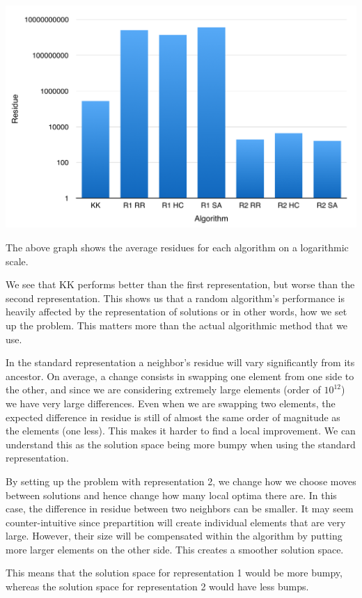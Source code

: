 \documentclass[11pt]{article}
\begin{document}
\begin{center}
\includegraphics[scale=0.5]{avinsto.png}
\end{center}
The above graph shows the average residues for each algorithm on a logarithmic scale. 

We see that KK performs better than the first representation, but worse than the second representation. This shows us that a random algorithm’s performance is heavily affected by the representation of solutions or in other words, how we set up the problem. This matters more than the actual algorithmic method that we use. 

In the standard representation a neighbor's residue will vary significantly from its ancestor. On average, a change consists in swapping one element from one side to the other, and since we are considering extremely large elements (order of $10^12$) we have very large differences. Even when we are swapping two elements, the expected difference in residue is still of almost the same order of magnitude as the elements (one less). This makes it harder to find a local improvement. We can understand this as the solution space being more bumpy when using the standard representation.

By setting up the problem with representation 2, we change how we choose moves between solutions and hence change how many local optima there are. In this case, the difference in residue between two neighbors can be smaller. It may seem counter-intuitive since prepartition will create individual elements that are very large. However, their size will be compensated within the algorithm by putting more larger elements on the other side. This creates a smoother solution space. 

This means that the solution space for representation 1 would be more bumpy, whereas the solution space for representation 2 would have less bumps.
\end{document}
